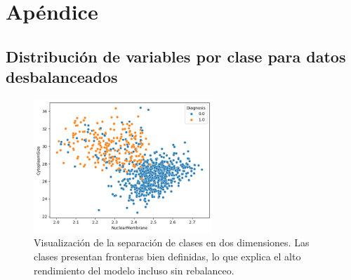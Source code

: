 \documentclass[11pt]{article}
\begin{document}
\appendix
\section{Apéndice}
\subsection{Distribución de variables por clase para datos desbalanceados}

\begin{figure}[H]
    \centering
    \includegraphics[width=0.6\textwidth]{figures/separability_scatter.png}
    \caption{Visualización de la separación de clases en dos dimensiones. Las clases presentan fronteras bien definidas, lo que explica el alto rendimiento del modelo incluso sin rebalanceo.}
    \label{fig:scatter_appendix}
\end{figure}
\end{document}
